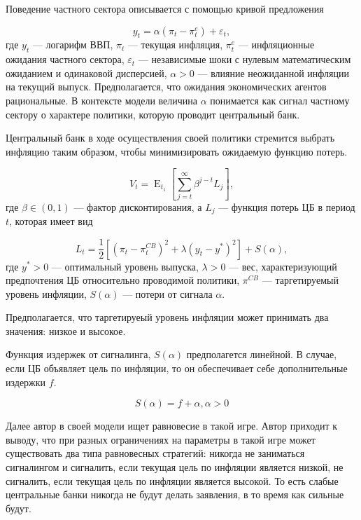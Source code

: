 \documentclass[14pt,a4paper, oneside]{extreport}
\DeclareMathOperator{\E}{\mathop{E}}
\def \a{\alpha}
\newcommand{\e}{\varepsilon}
\theoremstyle{plain}              %
\theoremstyle{definition}         %
\begin{document}
Поведение частного сектора описывается с помощью кривой предложения 

\begin{equation}
y_t = \a (\pi_t - \pi_t^e) + \e_t,
\end{equation} где $y_t$ --- логарифм ВВП, $\pi_t$ --- текущая инфляция, $\pi^e_t$ --- инфляционные ожидания частного сектора, $\e_t$ --- независимые шоки с нулевым математическим ожиданием и одинаковой дисперсией, $\a >0 $ --- влияние неожиданной инфляции на текущий выпуск. Предполагается, что ожидания экономических агентов рациональные. В контексте модели величина $\a$ понимается как сигнал частному сектору о характере политики, которую проводит центральный банк. 

Центральный банк в ходе осуществления своей политики стремится выбрать инфляцию таким образом, чтобы минимизировать ожидаемую функцию потерь. 

\begin{equation}
V_t = \E_{t_1} \left[ \sum_{j=t}^{\infty} \beta^{j-t} L_j \right ],
\end{equation} где $\beta \in (0,1)$ --- фактор дисконтирования, а $L_j$ --- функция потерь ЦБ в период $t$, которая имеет вид

\begin{equation}
L_t = \frac{1}{2} \left[ (\pi_t - \pi_t^{CB})^2 + \lambda (y_t-y^*)^2 \right] +S(\a),
\end{equation} где $y^*>0$ --- оптимальный уровень выпуска, $\lambda >0$ --- вес, характеризующий предпочтения ЦБ относительно проводимой политики, $\pi^{CB}$ --- таргетируемый уровень инфляции, $S(\a)$ --- потери от сигнала $\a$. 

Предполагается, что таргетируеый уровень инфляции может принимать два значения: низкое и высокое. 

Функция издержек от сигналинга, $S(\a)$ предполагется линейной. В случае, если ЦБ объявляет цель по инфляции, то он обеспечивает себе дополнительные издержки $f$. 

\begin{equation}
S(\a) = f + \a, \a >0
\end{equation}

Далее автор в своей модели ищет равновесие в такой игре. Автор приходит к выводу, что при разных ограничениях на параметры в такой игре может существовать два типа равновесных стратегий: никогда не заниматься сигналингом и сигналить, если текущая цель по инфляции является низкой, не сигналить, если текущая цель по инфляции является высокой. То есть слабые центральные банки никогда не будут делать заявления, в то время как сильные будут. 
\end{document}
